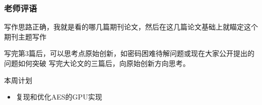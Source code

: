 \documentclass{beamer}
\begin{document}
\begin{frame}
    \frametitle{老师评语}
    \begin{alertblock}{写作思路正确，我就是看的哪几篇期刊论文，然后在这几篇论文基础上就瞄定这个期刊主题写作}
    \end{alertblock}
    \begin{alertblock}{写完第3篇后，可以思考点原始创新，如密码困难待解问题或现在大家公开提出的问题如何突破}
        写完大论文的三篇后，向原始创新方向思考。
    \end{alertblock}

    \begin{block}{本周计划}
        \begin{itemize}
            \item 复现和优化AES的GPU实现
        \end{itemize}
    \end{block}
\end{frame}
\end{document}
